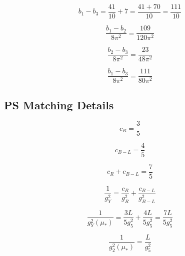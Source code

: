 \documentclass[11pt,a4paper]{article}
\theoremstyle{definition}
\begin{document}
\begin{equation}
\label{eq:beta_ext_6}
b_1 - b_3 = \frac{41}{10} + 7 = \frac{41 + 70}{10} = \frac{111}{10}
\end{equation}

\begin{equation}
\label{eq:beta_ext_7}
\frac{b_1 - b_2}{8\pi^2} = \frac{109}{120\pi^2}
\end{equation}

\begin{equation}
\label{eq:beta_ext_8}
\frac{b_2 - b_3}{8\pi^2} = \frac{23}{48\pi^2}
\end{equation}

\begin{equation}
\label{eq:beta_ext_9}
\frac{b_1 - b_3}{8\pi^2} = \frac{111}{80\pi^2}
\end{equation}

\subsection{PS Matching Details}
\label{subsec:ps_extended}

\begin{equation}
\label{eq:ps_ext_1}
c_R = \frac{3}{5}
\end{equation}

\begin{equation}
\label{eq:ps_ext_2}
c_{B-L} = \frac{4}{5}
\end{equation}

\begin{equation}
\label{eq:ps_ext_3}
c_R + c_{B-L} = \frac{7}{5}
\end{equation}

\begin{equation}
\label{eq:ps_ext_4}
\frac{1}{g_Y^2} = \frac{c_R}{g_R^2} + \frac{c_{B-L}}{g_{B-L}^2}
\end{equation}

\begin{equation}
\label{eq:ps_ext_5}
\frac{1}{g_Y^2(\mu_*)} = \frac{3L}{5g_5^2} + \frac{4L}{5g_5^2} = \frac{7L}{5g_5^2}
\end{equation}

\begin{equation}
\label{eq:ps_ext_6}
\frac{1}{g_2^2(\mu_*)} = \frac{L}{g_5^2}
\end{equation}
\end{document}
